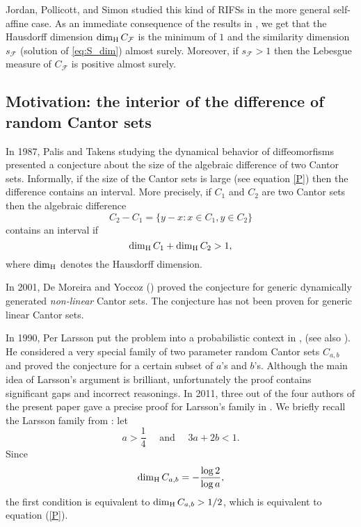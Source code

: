 \documentclass[amssymb,amsfonts,12pt,verbatim,righttag,oneside]{amsart}
\numberwithin{equation}{section} %
\theoremstyle{plain}
\newcommand*{\vect}[1]{\ensuremath{\underline{#1}}}
\theoremstyle{plain}
\renewcommand*{\vect}[1]{\ensuremath{\mathbf{ #1}}}
\begin{document}
Jordan, Pollicott, and Simon \cite{jordan2007hausdorff} studied this kind of
 RIFSs in the more general self-affine case. As an immediate consequence of the results in \cite{jordan2007hausdorff}, we get that the Hausdorff dimension $\dim_{\rm H}
 C_{\mathcal{F}}$ is the minimum of $1$ and the similarity dimension $s_{\mathcal{F}}$ (solution of \eqref{eq:S_dim}) almost surely. Moreover, if
 $s_{\mathcal{F}}>1$ then the Lebesgue measure of
 $C_{\mathcal{F}}$ is positive almost surely.

\subsection{Motivation: the interior of the difference of random Cantor sets }

In 1987, Palis and Takens \cite{PT} studying the dynamical behavior of diffeomorfisms presented a conjecture about the size of the algebraic difference of two Cantor sets. Informally,
if the size of the Cantor sets is large (see equation \eqref{P})
then the difference contains an interval. More precisely, if $C_1$ and $C_2$ are two Cantor sets then the algebraic difference
\begin{equation*}
C_2-C_1=\{y-x: x\in C_1,y\in C_2\}
\end{equation*}
contains an interval if
\begin{equation}\label{P}
\dim_{\rm H}C_1+\dim_{\rm H}C_2>1,
\end{equation}
where $\dim_{\rm H}$ denotes the Hausdorff dimension.

In 2001, De Moreira and Yoccoz (\cite{MY}) proved the conjecture for generic  dynamically generated \emph{non-linear} Cantor sets.
The conjecture has not been proven for generic linear Cantor sets.

In 1990, Per Larsson put the problem into a probabilistic context in
\cite{Larssonthesis}, (see also \cite{Larsson}). He considered a
very special family of two parameter random Cantor sets $C_{a,b}$ and proved
the conjecture for a certain subset of $a$'s and $b$'s. Although the main idea
of Larsson's argument is brilliant, unfortunately the proof contains
significant gaps and incorrect reasonings. In 2011, three out of the four
authors of the present paper gave a precise proof for Larsson's family in
\cite{dekking2011algebraic}. We briefly recall the Larsson family from
\cite{dekking2011algebraic}: let
\begin{equation*}\label{2}
a>\frac{1}{4}\quad  \mbox{ and }  \quad 3a+2b<1.
\end{equation*}
\noindent Since
$$\dim_{\rm H} C_{a,b}=-\frac{\log 2}{\log a},$$
the first condition is equivalent to $\dim_{\rm H}C_{a,b}>1/2$,
which is equivalent to equation (\ref{P}).
\end{document}
